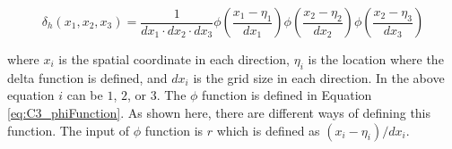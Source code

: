 \begin{equation}\label{eq:C3_regularizedDeltaFunction}
    \delta_h(x_1, x_2, x_3) = \frac{1}{dx_1 \cdot dx_2 \cdot dx_3}
                               \phi \left( \frac{x_1 - \eta_1}{dx_1} \right)
                               \phi \left( \frac{x_2 - \eta_2}{dx_2} \right)
                               \phi \left( \frac{x_2 - \eta_3}{dx_3} \right)
\end{equation}

where $x_i$ is the spatial coordinate in each direction, $\eta_i$ is the location where the delta function is defined, and $dx_i$ is the grid size in each direction. In the above equation $i$ can be $1$, $2$, or $3$. The $\phi$ function is defined in Equation \eqref{eq:C3_phiFunction}. As shown here, there are different ways of defining this function. The input of $\phi$ function is $r$ which is defined as $(x_i - \eta_i) / dx_i$.

